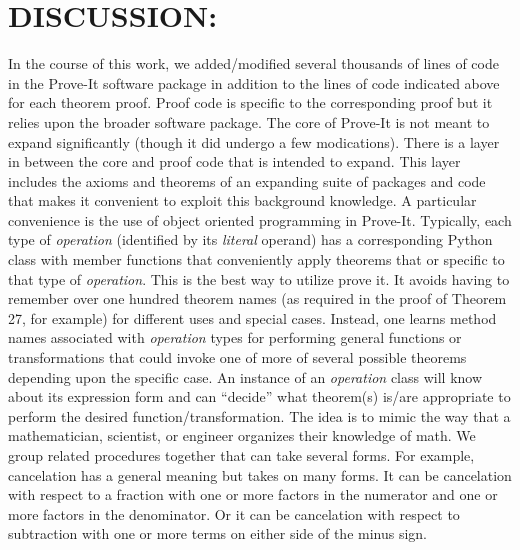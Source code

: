 \documentclass{article}[12pt]
\begin{document}
\section*{DISCUSSION:}
In the course of this work, we added/modified several thousands of lines of code in the Prove-It software package in addition to the lines of code indicated above for each theorem proof.  Proof code is specific to the corresponding proof but it relies upon the broader software package.  The core of Prove-It is not meant to expand significantly (though it did undergo a few modications).  There is a layer in between the core and proof code that is intended to expand.  This layer includes the axioms and theorems of an expanding suite of packages and code that makes it convenient to exploit this background knowledge.  A particular convenience is the use of object oriented programming in Prove-It.  Typically, each type of {\em operation} (identified by its {\em literal} operand) has a corresponding Python class with member functions that conveniently apply theorems that or specific to that type of {\em operation}.  This is the best way to utilize prove it.  It avoids having to remember over one hundred theorem names (as required in the proof of Theorem 27, for example) for different uses and special cases.  Instead, one learns method names associated with {\em operation} types for performing general functions or transformations that could invoke one of more of several possible theorems depending upon the specific case.  An instance of an {\em operation} class will know about its expression form and can ``decide'' what theorem(s) is/are appropriate to perform the desired function/transformation.  The idea is to mimic the way that a mathematician, scientist, or engineer organizes their knowledge of math.  We group related procedures together that can take several forms.  For example, cancelation has a general meaning but takes on many forms.  It can be cancelation with respect to a fraction with one or more factors in the numerator and one or more factors in the denominator.  Or it can be cancelation with respect to subtraction with one or more terms on either side of the minus sign.
\end{document}
